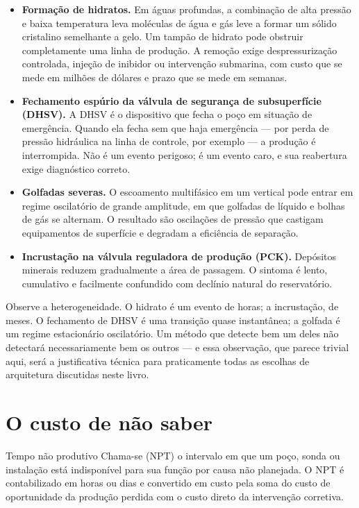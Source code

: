 \begin{itemize}[leftmargin=*,itemsep=0.4em]
  \item \textbf{Formação de hidratos.} Em águas profundas, a combinação de alta pressão
        e baixa temperatura leva moléculas de água e gás leve a formar um sólido
        cristalino semelhante a gelo. Um tampão de hidrato pode obstruir completamente
        uma linha de produção. A remoção exige despressurização controlada, injeção de
        inibidor ou intervenção submarina, com custo que se mede em milhões de dólares e
        prazo que se mede em semanas.
  \item \textbf{Fechamento espúrio da válvula de segurança de subsuperfície (DHSV).}
        A DHSV é o dispositivo que fecha o poço em situação de emergência. Quando ela
        fecha sem que haja emergência --- por perda de pressão hidráulica na linha de
        controle, por exemplo --- a produção é interrompida. Não é um evento perigoso;
        é um evento caro, e sua reabertura exige diagnóstico correto.
  \item \textbf{Golfadas severas.} O escoamento multifásico em um  vertical
        pode entrar em regime oscilatório de grande amplitude, em que golfadas de
        líquido e bolhas de gás se alternam. O resultado são oscilações de pressão que
        castigam equipamentos de superfície e degradam a eficiência de separação.
  \item \textbf{Incrustação na válvula reguladora de produção (PCK).} Depósitos
        minerais reduzem gradualmente a área de passagem. O sintoma é lento, cumulativo
        e facilmente confundido com declínio natural do reservatório.
\end{itemize}

Observe a heterogeneidade. O hidrato é um evento de horas; a incrustação, de meses. O
fechamento de DHSV é uma transição quase instantânea; a golfada é um regime
estacionário oscilatório. Um método que detecte bem um deles não detectará
necessariamente bem os outros --- e essa observação, que parece trivial aqui, será a
justificativa técnica para praticamente todas as escolhas de arquitetura discutidas
neste livro.

\section{O custo de não saber}

\begin{definicao}{Tempo não produtivo}
Chama-se  (NPT) o intervalo em que um
poço, sonda ou instalação está indisponível para sua função por causa não planejada.
O NPT é contabilizado em horas ou dias e convertido em custo pela soma do custo de
oportunidade da produção perdida com o custo direto da intervenção corretiva.
\end{definicao}

